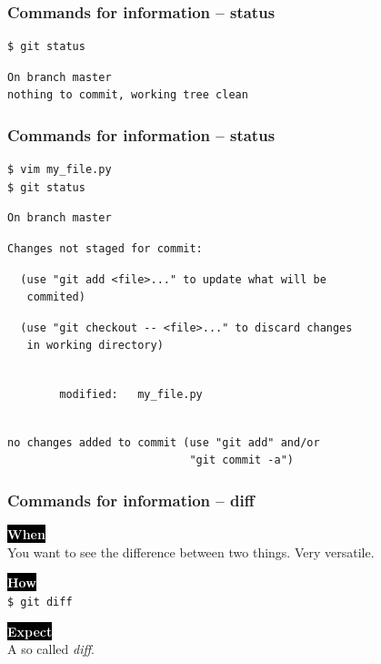\documentclass{beamer}
\newcommand{\keyword}[1]{\hspace{-1.0em}\colorbox{black}{\textcolor{white}{\textbf{#1}\vphantom{Ep}}}\vspace{0.2em}} %
\begin{document}
\begin{frame}[fragile]
  \frametitle{Commands for information -- status}

\begin{verbatim}
$ git status
\end{verbatim}
\pause{}
\begin{verbatim}
On branch master
nothing to commit, working tree clean
\end{verbatim}
\end{frame}

\begin{frame}[fragile]
  \frametitle{Commands for information -- status}

\begin{verbatim}
$ vim my_file.py
$ git status
\end{verbatim}
\pause{}
\vspace{-3.5ex}
\begin{verbatim}
On branch master
\end{verbatim}
\pause{}
\vspace{-3.5ex}
\begin{verbatim}
Changes not staged for commit:
\end{verbatim}
\pause{}
\vspace{-3.5ex}
\begin{verbatim}
  (use "git add <file>..." to update what will be
   commited)
\end{verbatim}
\pause{}
\vspace{-3.5ex}
\begin{verbatim}
  (use "git checkout -- <file>..." to discard changes
   in working directory)
\end{verbatim}
\pause{}
\vspace{-3.5ex}
\begin{verbatim}

        modified:   my_file.py
\end{verbatim}
\pause{}
\vspace{-3.5ex}
\begin{verbatim}

no changes added to commit (use "git add" and/or
                            "git commit -a")
\end{verbatim}
\end{frame}

\begin{frame}
  \frametitle{Commands for information -- diff}

  \keyword{When}\\
  You want to see the difference between two things. Very versatile.
  \vspace{0.5em}

  \keyword{How}\\
  \texttt{\$ git diff}
  \vspace{0.5em}

  \keyword{Expect}\\
  A so called \emph{diff}.
\end{frame}
\end{document}
